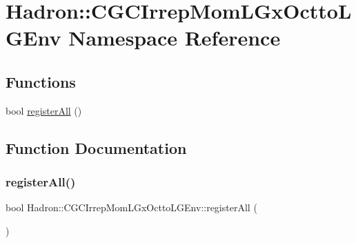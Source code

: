 \hypertarget{namespaceHadron_1_1CGCIrrepMomLGxOcttoLGEnv}{}\section{Hadron\+:\+:C\+G\+C\+Irrep\+Mom\+L\+Gx\+Octto\+L\+G\+Env Namespace Reference}
\label{namespaceHadron_1_1CGCIrrepMomLGxOcttoLGEnv}
\subsection*{Functions}
\begin{DoxyCompactItemize}
\item 
bool \mbox{\hyperlink{namespaceHadron_1_1CGCIrrepMomLGxOcttoLGEnv_a8e2a60d80852181dcdfbcef290164852}{register\+All}} ()
\end{DoxyCompactItemize}


\subsection{Function Documentation}
\mbox{\label{namespaceHadron_1_1CGCIrrepMomLGxOcttoLGEnv_a8e2a60d80852181dcdfbcef290164852}} 
\subsubsection{\texorpdfstring{registerAll()}{registerAll()}}
{\footnotesize\ttfamily bool Hadron\+::\+C\+G\+C\+Irrep\+Mom\+L\+Gx\+Octto\+L\+G\+Env\+::register\+All (\begin{DoxyParamCaption}{ }\end{DoxyParamCaption})}

